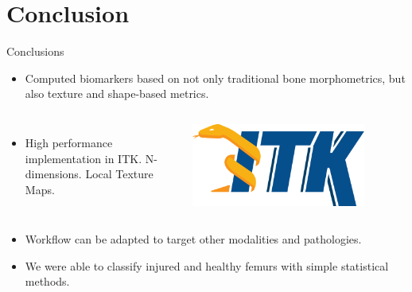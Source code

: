 \documentclass[10pt,aspectratio=169]{beamer}
\begin{document}
\section{Conclusion}

\begin{frame}{Conclusions}
  \begin{itemize} \itemsep1.0em

    \item Computed biomarkers based on not only traditional bone morphometrics, but also texture and shape-based metrics.
  \end{itemize}

  \begin{columns}[onlytextwidth]
    \begin{itemize} \itemsep1.0em
      \item High performance implementation in ITK. N-dimensions. Local Texture Maps.
    \end{itemize}
    \centering
    \includegraphics[width=0.8\textwidth]{./logos/logo_ITK.png}
  \end{columns}

  \begin{itemize} \itemsep1.0em
    \item Workflow can be adapted to target other modalities and pathologies.
    \item We were able to classify injured and healthy femurs with simple statistical methods.
  \end{itemize}
\end{frame}
\end{document}
